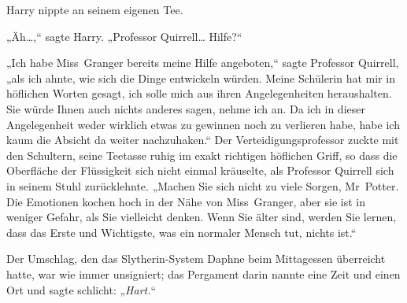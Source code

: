 Harry nippte an seinem eigenen Tee.

„Äh…,“ sagte Harry. „Professor Quirrell… Hilfe?“

„Ich habe Miss~Granger bereits meine Hilfe angeboten,“ sagte Professor Quirrell, „als ich ahnte, wie sich die Dinge entwickeln würden. Meine Schülerin hat mir in höflichen Worten gesagt, ich solle mich aus ihren Angelegenheiten heraushalten. Sie würde Ihnen auch nichts anderes sagen, nehme ich an. Da ich in dieser Angelegenheit weder wirklich etwas zu gewinnen noch zu verlieren habe, habe ich kaum die Absicht da weiter nachzuhaken.“ Der Verteidigungsprofessor zuckte mit den Schultern, seine Teetasse ruhig im exakt richtigen höflichen Griff, so dass die Oberfläche der Flüssigkeit sich nicht einmal kräuselte, als Professor Quirrell sich in seinem Stuhl zurücklehnte. „Machen Sie sich nicht zu viele Sorgen, Mr~Potter. Die Emotionen kochen hoch in der Nähe von Miss~Granger, aber sie ist in weniger Gefahr, als Sie vielleicht denken. Wenn Sie älter sind, werden Sie lernen, dass das Erste und Wichtigste, was ein normaler Mensch tut, nichts ist.“

\later

Der Umschlag, den das Slytherin-System Daphne beim Mittagessen überreicht hatte, war wie immer unsigniert; das Pergament darin nannte eine Zeit und einen Ort und sagte schlicht: „\emph{Hart.}“

